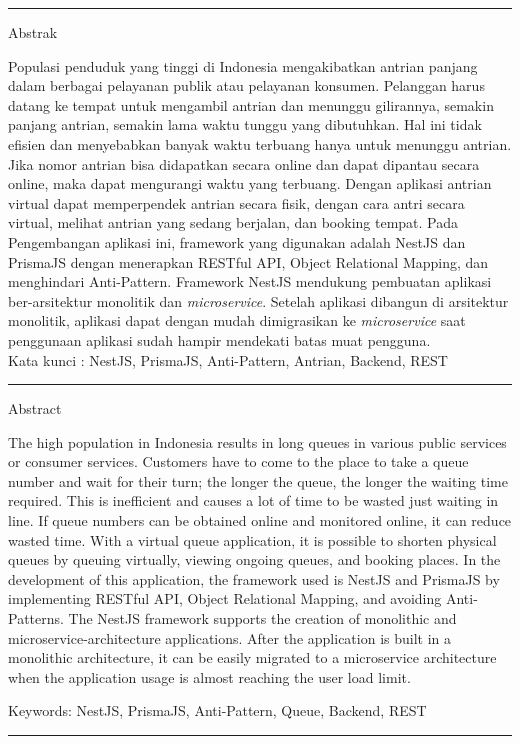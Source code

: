 {\bf \parindent0pt \noindent\rule{\textwidth}{1pt}
Abstrak

Populasi penduduk yang tinggi di Indonesia mengakibatkan antrian panjang dalam berbagai pelayanan publik atau pelayanan konsumen. Pelanggan harus datang ke tempat untuk mengambil antrian dan menunggu gilirannya, semakin panjang antrian, semakin lama waktu tunggu yang dibutuhkan. Hal ini tidak efisien dan menyebabkan banyak waktu terbuang hanya untuk menunggu antrian. Jika nomor antrian bisa didapatkan secara online dan dapat dipantau secara online, maka dapat mengurangi waktu yang terbuang. Dengan aplikasi antrian virtual dapat memperpendek antrian secara fisik, dengan cara antri secara virtual, melihat antrian yang sedang berjalan, dan booking tempat. Pada Pengembangan aplikasi ini, framework yang digunakan adalah NestJS dan PrismaJS dengan menerapkan RESTful API, Object Relational Mapping, dan menghindari Anti-Pattern. Framework NestJS mendukung pembuatan aplikasi ber-arsitektur monolitik dan \textit{microservice}. Setelah aplikasi dibangun di arsitektur monolitik, aplikasi dapat dengan mudah dimigrasikan ke \textit{microservice} saat penggunaan aplikasi sudah hampir mendekati batas muat pengguna.\\

 \bigskip
Kata kunci : NestJS, PrismaJS, Anti-Pattern, Antrian, Backend, REST






\noindent\rule{\textwidth}{1pt}
Abstract

The high population in Indonesia results in long queues in various public services or consumer services. Customers have to come to the place to take a queue number and wait for their turn; the longer the queue, the longer the waiting time required. This is inefficient and causes a lot of time to be wasted just waiting in line. If queue numbers can be obtained online and monitored online, it can reduce wasted time. With a virtual queue application, it is possible to shorten physical queues by queuing virtually, viewing ongoing queues, and booking places. In the development of this application, the framework used is NestJS and PrismaJS by implementing RESTful API, Object Relational Mapping, and avoiding Anti-Patterns. The NestJS framework supports the creation of monolithic and microservice-architecture applications. After the application is built in a monolithic architecture, it can be easily migrated to a microservice architecture when the application usage is almost reaching the user load limit.

 \bigskip
 Keywords: NestJS, PrismaJS, Anti-Pattern, Queue, Backend, REST

\noindent\rule{\textwidth}{1pt} }
   


